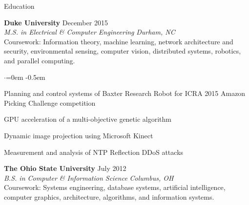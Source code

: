 \documentclass{resume} %
\begin{document}

\begin{rSection}{Education}

{\bf Duke University} \hfill December 2015 \\
{\em M.S. in Electrical \& Computer Engineering} \hfill {\em Durham, NC}
\smallskip \\
Coursework: Information theory, machine learning, network architecture and
security, environmental sensing, computer vision, distributed systems,
robotics, and parallel computing. \smallskip

\begin{list}{$\cdot$}{\leftmargin=0em}
\itemsep -0.5em \vspace{-0.5em}
\item Planning and control systems of Baxter Research Robot for ICRA 2015 Amazon
Picking Challenge competition
\item GPU acceleration of a multi-objective genetic algorithm
\item Dynamic image projection using Microsoft Kinect
\item Measurement and analysis of NTP Reflection DDoS attacks
\end{list}

{\bf The Ohio State University} \hfill July 2012 \\
{\em B.S. in Computer \& Information Science} \hfill {\em Columbus, OH}
\smallskip \\
Coursework: Systems engineering, database systems, artificial intelligence,
computer graphics, architecture, algorithms, and information systems.

\end{rSection}

\end{document}

